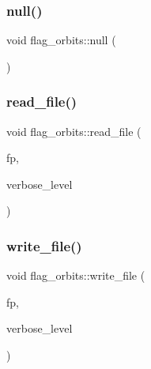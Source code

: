 \mbox{\label{classflag__orbits_ac4838e24c9f7bde2bcf960be531285ce}} 
\subsubsection{\texorpdfstring{null()}{null()}}
{\footnotesize\ttfamily void flag\+\_\+orbits\+::null (\begin{DoxyParamCaption}{ }\end{DoxyParamCaption})}

\mbox{\label{classflag__orbits_af039682144f9ad076b151a3307990486}} 
\subsubsection{\texorpdfstring{read\+\_\+file()}{read\_file()}}
{\footnotesize\ttfamily void flag\+\_\+orbits\+::read\+\_\+file (\begin{DoxyParamCaption}\item[{ifstream \&}]{fp,  }\item[{\mbox{\hyperlink{galois_8h_a09fddde158a3a20bd2dcadb609de11dc}{I\+NT}}}]{verbose\+\_\+level }\end{DoxyParamCaption})}

\mbox{\label{classflag__orbits_ab78ccdf1556f304c033dda914a6b381b}} 
\subsubsection{\texorpdfstring{write\+\_\+file()}{write\_file()}}
{\footnotesize\ttfamily void flag\+\_\+orbits\+::write\+\_\+file (\begin{DoxyParamCaption}\item[{ofstream \&}]{fp,  }\item[{\mbox{\hyperlink{galois_8h_a09fddde158a3a20bd2dcadb609de11dc}{I\+NT}}}]{verbose\+\_\+level }\end{DoxyParamCaption})}



